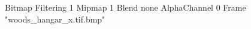 {Bitmap
	{Filtering 1}
	{Mipmap 1}
	{Blend none}
	{AlphaChannel 0}
	{Frame "woods_hangar_x.tif.bmp"}
}
